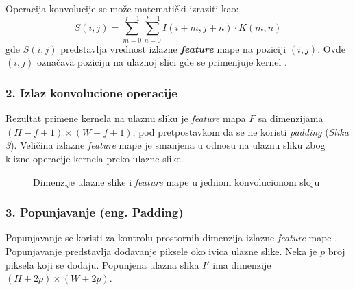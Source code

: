 \documentclass[12pt]{article}
\begin{document}
   Operacija konvolucije se može matematički izraziti kao:
   \[
   S(i, j) = \sum_{m=0}^{f-1} \sum_{n=0}^{f-1} I(i+m, j+n) \cdot K(m, n)
   \]
   gde \( S(i, j) \) predstavlja vrednost izlazne \textbf{\textit{feature}} mape na poziciji 
   \((i, j)\). Ovde \( (i, j) \) označava poziciju na ulaznoj slici gde se primenjuje kernel \cite{conv}.

   \subsubsection*{2. Izlaz konvolucione operacije}
   Rezultat primene kernela na ulaznu sliku je \textit{feature} mapa \( F \) 
   sa dimenzijama \((H - f + 1) \times (W - f + 1)\), pod pretpostavkom da se ne 
   koristi \textit{padding} (\textit{Slika 3}). Veličina izlazne \textit{feature} mape je 
   smanjena u odnosu na ulaznu sliku zbog klizne operacije kernela preko ulazne slike.

   \newpage   

   \begin{figure}[h!]
      \centering
      \caption{Dimenzije ulazne slike i \textit{feature} mape u jednom konvolucionom sloju}
      \label{fig:convolution}
    \end{figure}

    \subsubsection*{3. Popunjavanje (eng. Padding)}

    Popunjavanje se koristi za kontrolu prostornih dimenzija izlazne \textit{feature} mape \cite{padding}. 
    Popunjavanje predstavlja dodavanje piksele oko ivica ulazne slike. 
    Neka je \( p \) broj piksela koji se dodaju. 
    Popunjena ulazna slika \( I' \) ima dimenzije \((H + 2p) \times (W + 2p)\).
    
\end{document}

